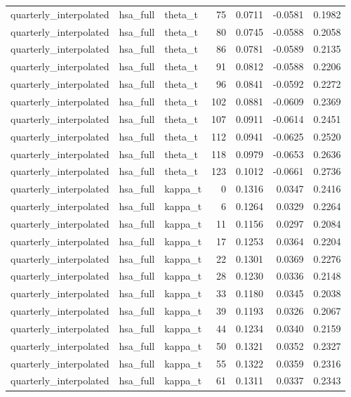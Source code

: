 \begin{tabular}{lllrrrr}
quarterly\_interpolated & hsa\_full & theta\_t & 75 & 0.0711 & -0.0581 & 0.1982 \\
quarterly\_interpolated & hsa\_full & theta\_t & 80 & 0.0745 & -0.0588 & 0.2058 \\
quarterly\_interpolated & hsa\_full & theta\_t & 86 & 0.0781 & -0.0589 & 0.2135 \\
quarterly\_interpolated & hsa\_full & theta\_t & 91 & 0.0812 & -0.0588 & 0.2206 \\
quarterly\_interpolated & hsa\_full & theta\_t & 96 & 0.0841 & -0.0592 & 0.2272 \\
quarterly\_interpolated & hsa\_full & theta\_t & 102 & 0.0881 & -0.0609 & 0.2369 \\
quarterly\_interpolated & hsa\_full & theta\_t & 107 & 0.0911 & -0.0614 & 0.2451 \\
quarterly\_interpolated & hsa\_full & theta\_t & 112 & 0.0941 & -0.0625 & 0.2520 \\
quarterly\_interpolated & hsa\_full & theta\_t & 118 & 0.0979 & -0.0653 & 0.2636 \\
quarterly\_interpolated & hsa\_full & theta\_t & 123 & 0.1012 & -0.0661 & 0.2736 \\
quarterly\_interpolated & hsa\_full & kappa\_t & 0 & 0.1316 & 0.0347 & 0.2416 \\
quarterly\_interpolated & hsa\_full & kappa\_t & 6 & 0.1264 & 0.0329 & 0.2264 \\
quarterly\_interpolated & hsa\_full & kappa\_t & 11 & 0.1156 & 0.0297 & 0.2084 \\
quarterly\_interpolated & hsa\_full & kappa\_t & 17 & 0.1253 & 0.0364 & 0.2204 \\
quarterly\_interpolated & hsa\_full & kappa\_t & 22 & 0.1301 & 0.0369 & 0.2276 \\
quarterly\_interpolated & hsa\_full & kappa\_t & 28 & 0.1230 & 0.0336 & 0.2148 \\
quarterly\_interpolated & hsa\_full & kappa\_t & 33 & 0.1180 & 0.0345 & 0.2038 \\
quarterly\_interpolated & hsa\_full & kappa\_t & 39 & 0.1193 & 0.0326 & 0.2067 \\
quarterly\_interpolated & hsa\_full & kappa\_t & 44 & 0.1234 & 0.0340 & 0.2159 \\
quarterly\_interpolated & hsa\_full & kappa\_t & 50 & 0.1321 & 0.0352 & 0.2327 \\
quarterly\_interpolated & hsa\_full & kappa\_t & 55 & 0.1322 & 0.0359 & 0.2316 \\
quarterly\_interpolated & hsa\_full & kappa\_t & 61 & 0.1311 & 0.0337 & 0.2343 \\

\end{tabular}
